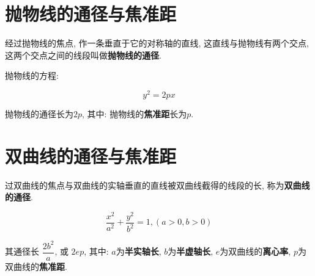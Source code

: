 \section{抛物线的通径与焦准距}

经过抛物线的焦点, 作一条垂直于它的对称轴的直线, 这直线与抛物线有两个交点, 这两个交点之间的线段叫做\textbf{抛物线的通径}. 

抛物线的方程:

\[
  y^2=2px
\]

抛物线的通径长为$2p$, 其中: 抛物线的\textbf{焦准距}长为$p$. 

\section{双曲线的通径与焦准距}

过双曲线的焦点与双曲线的实轴垂直的直线被双曲线截得的线段的长, 称为\textbf{双曲线的通径}. 

\[
  \dfrac{x^2}{a^2}+\dfrac{y^2}{b^2}=1,(a >0, b > 0)
\]

其通径长 $\dfrac{2b^2}{a}$, 或 $2ep$, 
其中: $a$为\textbf{半实轴长}, $b$为\textbf{半虚轴长}, $e$为双曲线的\textbf{离心率}, $p$为双曲线的\textbf{焦准距}. 
